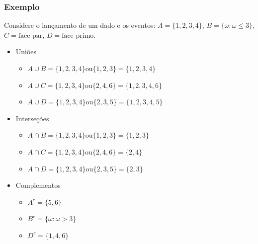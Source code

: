 \documentclass[11pt]{beamer}
\begin{document}
\begin{frame}
\frametitle{Exemplo}

Considere o lançamento de um dado e os eventos: \(A = \{1,2,3,4\}\),
\(B = \{\omega:\omega\leq 3\}\), \(C = \text{face par}\),
\(D = \text{face
primo}\).

\begin{itemize}
\item
  Uniões

  \begin{itemize}
  \item
    \(A\cup B = \{1,2,3,4\} \text{ou} \{1,2,3\} = \{1,2,3,4\}\)
  \item
    \(A\cup C = \{1,2,3,4\} \text{ou} \{2,4,6\} = \{1,2,3,4,6\}\)
  \item
    \(A\cup D = \{1,2,3,4\} \text{ou} \{2,3,5\} = \{1,2,3,4,5\}\)
  \end{itemize}
\item
  Interseções

  \begin{itemize}
  \item
    \(A\cap B = \{1,2,3,4\} \text{ou} \{1,2,3\} = \{1,2,3\}\)
  \item
    \(A\cap C = \{1,2,3,4\} \text{ou} \{2,4,6\} = \{2,4\}\)
  \item
    \(A\cap D = \{1,2,3,4\} \text{ou} \{2,3,5\} = \{2,3\}\)
  \end{itemize}
\item
  Complementos

  \begin{itemize}
  \item
    \(A^c = \{5,6\}\)
  \item
    \(B^c = \{\omega: \omega> 3\}\)
  \item
    \(D^c = \{1,4,6\}\)
  \end{itemize}
\end{itemize}
\end{frame}
\end{document}
